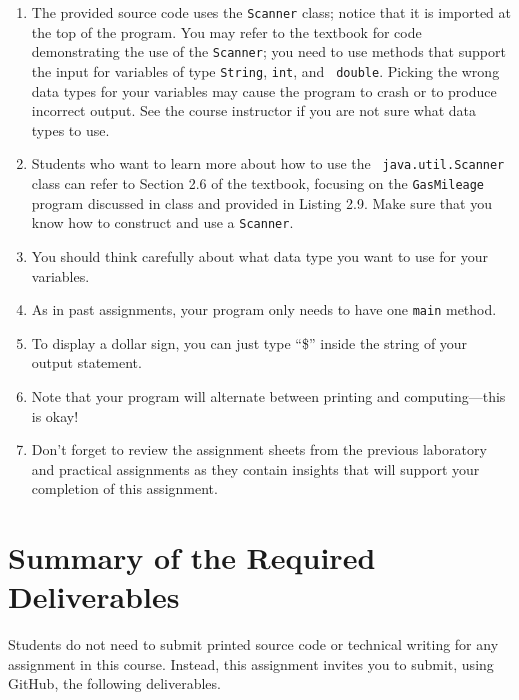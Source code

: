 \documentclass[11pt]{article}
\begin{document}
\begin{enumerate}
  \setlength{\itemsep}{0pt}

\item The provided source code uses the {\tt Scanner} class; notice that it is
  imported at the top of the program. You may refer to the textbook for code
  demonstrating the use of the {\tt Scanner}; you need to use methods that
  support the input for variables of type {\tt String}, {\tt int}, and {\tt
  double}. Picking the wrong data types for your variables may cause the program
  to crash or to produce incorrect output. See the course instructor if you are
  not sure what data types to use.

\item Students who want to learn more about how to use the {\tt
  java.util.Scanner} class can refer to Section 2.6 of the textbook, focusing on
  the {\tt GasMileage} program discussed in class and provided in Listing 2.9.
  Make sure that you know how to construct and use a {\tt Scanner}.

\item You should think carefully about what data type you want to use for your
  variables.

\item As in past assignments, your program only needs to have one {\tt main}
  method.

\item To display a dollar sign, you can just type ``\$'' inside the string of
  your output statement.

\item Note that your program will alternate between printing and
  computing---this is okay!

\item Don't forget to review the assignment sheets from the previous laboratory
  and practical assignments as they contain insights that will support your
  completion of this assignment.

\end{enumerate}

\section*{Summary of the Required Deliverables}

\noindent Students do not need to submit printed source code or technical
writing for any assignment in this course. Instead, this assignment invites you
to submit, using GitHub, the following deliverables.
\end{document}
